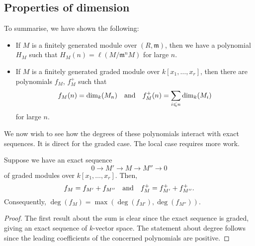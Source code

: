 \documentclass[12pt]{article}
\begin{document}
\subsection{Properties of dimension}

To summarise, we have shown the following:
\begin{itemize}
	\item If $M$ is a finitely generated module over $(R, \mathfrak{m})$, then we have a polynomial $H_{M}$ such that $H_{M}(n) = \ell(M/\mathfrak{m}^{n} M)$ for large $n$.
	\item If $M$ is a finitely generated graded module over $k[x_{1}, \ldots, x_{r}]$, then there are polynomials $f_{M}$, $f_{M}^{+}$ such that
	\begin{equation*} 
		f_{M}(n) = \dim_{k}(M_{n}) \quad\text{and}\quad f_{M}^{+}(n) = \sum_{i \leqslant n} \dim_{k}(M_{i})
	\end{equation*}
	for large $n$.
\end{itemize}

We now wish to see how the degrees of these polynomials interact with exact sequences. It is direct for the graded case. The local case requires more work.

\begin{prop}
	Suppose we have an exact sequence
	\begin{equation*} 
		0 \to M' \to M \to M'' \to 0
	\end{equation*}
	of graded modules over $k[x_{1}, \ldots, x_{r}]$. Then,
	\begin{equation*} 
		f_{M} = f_{M'} + f_{M''} \quad\text{and}\quad f_{M}^{+} = f_{M'}^{+} + f_{M''}^{+}.
	\end{equation*}
	Consequently, $\deg(f_{M}) = \max(\deg(f_{M'}), \deg(f_{M''}))$.
\end{prop}
\begin{proof} 
	The first result about the sum is clear since the exact sequence is graded, giving an exact sequence of $k$-vector space. \newline
	The statement about degree follows since the leading coefficients of the concerned polynomials are positive.
\end{proof}
\end{document}
